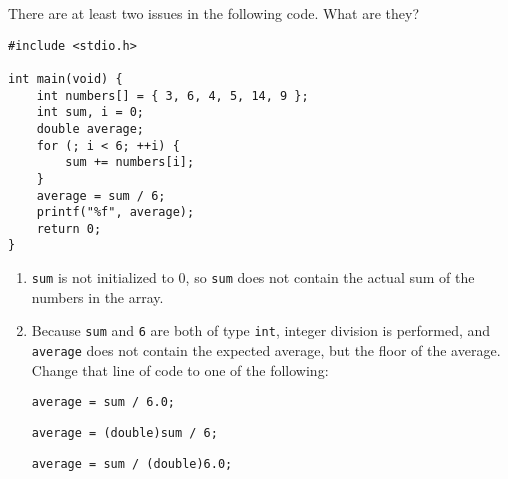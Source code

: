 There are at least two issues in the following code. What are they?

\begin{verbatim}
#include <stdio.h>

int main(void) {
    int numbers[] = { 3, 6, 4, 5, 14, 9 };
    int sum, i = 0;
    double average;
    for (; i < 6; ++i) {
        sum += numbers[i];
    }
    average = sum / 6;
    printf("%f", average);
    return 0;
}
\end{verbatim}

\begin{answer}
\begin{enumerate}
\item \texttt{sum} is not initialized to 0, so \texttt{sum} does not contain the actual sum of the numbers in the array.
\item Because \texttt{sum} and \texttt{6} are both of type \texttt{int}, integer division is performed, and \texttt{average} does not contain the expected average, but the floor of the average. Change that line of code to one of the following:
\begin{verbatim}
average = sum / 6.0;
\end{verbatim}
\begin{verbatim}
average = (double)sum / 6;
\end{verbatim}
\begin{verbatim}
average = sum / (double)6.0;
\end{verbatim}
\end{enumerate}
\end{answer}
